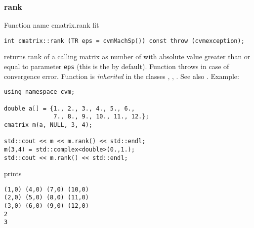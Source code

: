 \subsubsection{rank}
Function%
\pdfdest name {cmatrix.rank} fit
\begin{verbatim}
int cmatrix::rank (TR eps = cvmMachSp()) const throw (cvmexception);
\end{verbatim}
returns  rank of a calling matrix as  number of
with 
absolute value greater than or
equal to  parameter \verb"eps" (this is the
 by default).
Function throws 
in case of convergence error.
Function is \emph{inherited} in the classes
, ,
.
See also
.
Example:
\begin{Verbatim}
using namespace cvm;

double a[] = {1., 2., 3., 4., 5., 6.,
              7., 8., 9., 10., 11., 12.};
cmatrix m(a, NULL, 3, 4);

std::cout << m << m.rank() << std::endl;
m(3,4) = std::complex<double>(0.,1.);
std::cout << m.rank() << std::endl;
\end{Verbatim}
prints
\begin{Verbatim}
(1,0) (4,0) (7,0) (10,0)
(2,0) (5,0) (8,0) (11,0)
(3,0) (6,0) (9,0) (12,0)
2
3
\end{Verbatim}
\newpage



